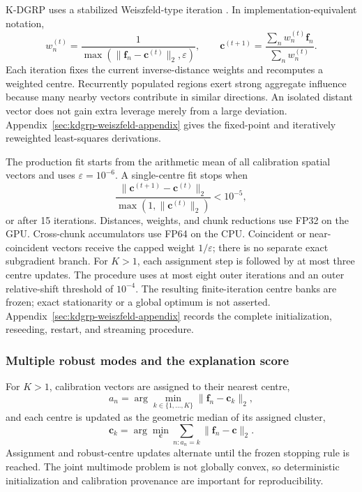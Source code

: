 K-DGRP uses a stabilized Weiszfeld-type iteration
\cite{weiszfeld1937median}. In implementation-equivalent notation,
\begin{equation}
    w_n^{(t)}=
    \frac{1}{\max\!\left(\|\bm f_n-\bm c^{(t)}\|_2,\varepsilon\right)},
    \qquad
    \boxed{
    \bm c^{(t+1)}=
    \frac{\sum_n w_n^{(t)}\bm f_n}
         {\sum_n w_n^{(t)}}.}
    \label{eq:weiszfeld-update}
\end{equation}
Each iteration fixes the current inverse-distance weights and recomputes a
weighted centre. Recurrently populated regions exert strong aggregate influence
because many nearby vectors contribute in similar directions. An isolated
distant vector does not gain extra leverage merely from a large deviation.
Appendix~\ref{sec:kdgrp-weiszfeld-appendix} gives the fixed-point and
iteratively reweighted least-squares derivations.

The production fit starts from the arithmetic mean of all calibration spatial
vectors and uses $\varepsilon=10^{-6}$. A single-centre fit stops when
\begin{equation}
    \frac{\|\bm c^{(t+1)}-\bm c^{(t)}\|_2}
         {\max(1,\|\bm c^{(t)}\|_2)}<10^{-5},
    \label{eq:kdgrp-single-stop}
\end{equation}
or after 15 iterations. Distances, weights, and chunk reductions use FP32 on
the GPU. Cross-chunk accumulators use FP64 on the CPU. Coincident or
near-coincident vectors receive the capped weight $1/\varepsilon$; there is no
separate exact subgradient branch. For $K>1$, each assignment step is followed
by at most three centre updates. The procedure uses at most eight outer
iterations and an outer relative-shift threshold of $10^{-4}$. The resulting
finite-iteration centre banks are frozen; exact stationarity or a global
optimum is not asserted. Appendix~\ref{sec:kdgrp-weiszfeld-appendix} records
the complete initialization, reseeding, restart, and streaming procedure.

\subsubsection{Multiple robust modes and the explanation score}

For $K>1$, calibration vectors are assigned to their nearest centre,
\begin{equation}
    a_n=\arg\min_{k\in\{1,\ldots,K\}}
        \|\bm f_n-\bm c_k\|_2,
\end{equation}
and each centre is updated as the geometric median of its assigned cluster,
\begin{equation}
    \bm c_k=\arg\min_{\bm c}
       \sum_{n:a_n=k}\|\bm f_n-\bm c\|_2.
\end{equation}
Assignment and robust-centre updates alternate until the frozen stopping rule
is reached. The joint multimode problem is not globally convex, so deterministic
initialization and calibration provenance are important for reproducibility.

